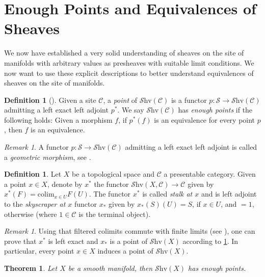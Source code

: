 \documentclass[10pt]{amsart}
\newcommand{\C}{\mathscr{C}}
\newcommand{\s}{\mathscr{S}}
\newcommand{\colim}{\mathrm{colim}}
\newcommand{\Shv}{\mathscr{S}\mathrm{hv}}
\newtheorem{theorem}[equation]{Theorem}
\theoremstyle{definition}
\newtheorem{definition}[equation]{Definition}
\theoremstyle{remark}
\newtheorem{remark}[equation]{Remark}
\numberwithin{equation}{section}
\begin{document}
\section{Enough Points and Equivalences of Sheaves}
We now have established a very solid understanding of sheaves on the site of manifolds with arbitrary values as presheaves with suitable limit conditions. We now want to use these explicit descriptions to better understand equivalences of sheaves on the site of manifolds.
\begin{definition}[{\cite[Remark 6.5.4.8]{lurie2009htt}}]\label{def:point}
	Given a site $\C$, a \emph{point} of $\Shv(\C)$ is a functor $p:\s\to\Shv(\C)$ admitting a left exact left adjoint $p^*$. We say $\Shv(\C)$ has \emph{enough points} if the following holds: Given a morphism $f$, if $p^*(f)$ is an equivalence for every point $p$, then $f$ is an equivalence.
\end{definition}
\begin{remark}
	A functor $p:\s\to\Shv(\C)$ admitting a left exact left adjoint is called a \emph{geometric morphism}, see \cite[Definition 6.3.1.1]{lurie2009htt}. 
\end{remark}
\begin{definition}\label{def:stalk}
	Let $X$ be a topological space and $\C$ a presentable category. Given a point $x\in X$, denote by $x^*$ the functor $\Shv(X,\C)\to\C$ given by $x^*(F)=\colim_{x\in U}F(U)$. The functor $x^*$ is called 
	\emph{stalk at $x$} and is left adjoint to the \emph{skyscraper at $x$} functor $x_*$ given by $x_*(S)(U)=S$, if $x\in U$, and $=1$, otherwise (where $1\in\C$ is the terminal object).
\end{definition}
\begin{remark}\label{rmk:pointsheaf}
	Using that filtered colimits commute with finite limits (see \cite[Example 7.3.4.7]{lurie2009htt}), one can prove that $x^*$ is left exact and $x_*$ is a point of $\Shv(X)$ according to \cref{def:point}. In particular, every point $x\in X$ induces a point of $\Shv(X)$. 
\end{remark}
\begin{theorem}\label{thm:enougpoints}
	Let $X$ be a smooth manifold, then $\Shv(X)$ has enough points. 
\end{theorem}
\end{document}
